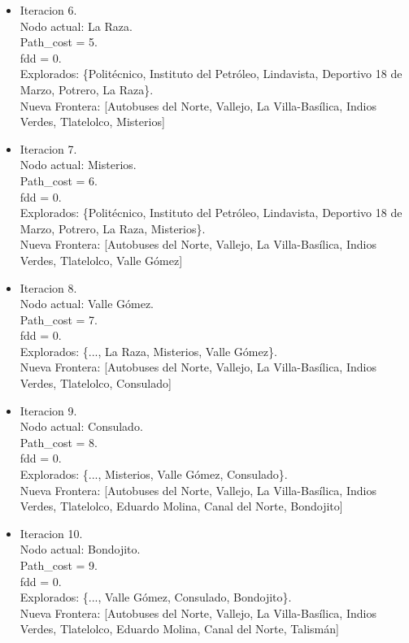 \documentclass[10pt,a4paper]{article}
\begin{document}
\begin{itemize}
    \item Iteracion 6.\\
    Nodo actual: La Raza.\\
    Path\_cost = 5.\\
    fdd = 0.\\
    Explorados: \{Politécnico, Instituto del Petróleo, Lindavista, Deportivo 18 de Marzo, Potrero, La Raza\}.\\
    Nueva Frontera: [Autobuses del Norte, Vallejo, La Villa-Basílica, Indios Verdes, Tlatelolco, Misterios]
    
    \item Iteracion 7.\\
    Nodo actual: Misterios.\\
    Path\_cost = 6.\\
    fdd = 0.\\
    Explorados: \{Politécnico, Instituto del Petróleo, Lindavista, Deportivo 18 de Marzo, Potrero, La Raza, Misterios\}.\\
    Nueva Frontera: [Autobuses del Norte, Vallejo, La Villa-Basílica, Indios Verdes, Tlatelolco, Valle Gómez]

    \item Iteracion 8.\\
    Nodo actual: Valle Gómez.\\
    Path\_cost = 7.\\
    fdd = 0.\\
    Explorados: \{..., La Raza, Misterios, Valle Gómez\}.\\
    Nueva Frontera: [Autobuses del Norte, Vallejo, La Villa-Basílica, Indios Verdes, Tlatelolco, Consulado]

    \item Iteracion 9.\\
    Nodo actual: Consulado.\\
    Path\_cost = 8.\\
    fdd = 0.\\
    Explorados: \{..., Misterios, Valle Gómez, Consulado\}.\\
    Nueva Frontera: [Autobuses del Norte, Vallejo, La Villa-Basílica, Indios Verdes, Tlatelolco, Eduardo Molina, Canal del Norte, Bondojito]

    \item Iteracion 10.\\
    Nodo actual: Bondojito.\\
    Path\_cost = 9.\\
    fdd = 0.\\
    Explorados: \{..., Valle Gómez, Consulado, Bondojito\}.\\
    Nueva Frontera: [Autobuses del Norte, Vallejo, La Villa-Basílica, Indios Verdes, Tlatelolco, Eduardo Molina, Canal del Norte, Talismán]

\end{itemize}
\end{document}
